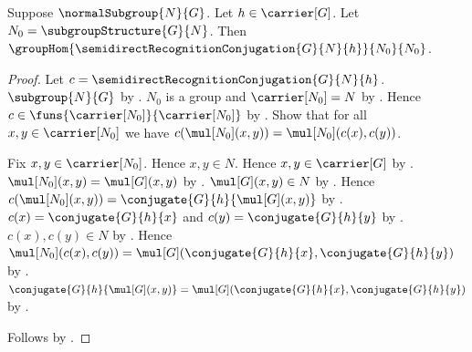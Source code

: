 \begin{theorem}\label{semidirect_recognition_conjugation_hom}
    Suppose $\normalSubgroup{N}{G}$.
    Let $h\in\carrier[G]$.
    Let $N_0=\subgroupStructure{G}{N}$.
    Then
        $\groupHom{\semidirectRecognitionConjugation{G}{N}{h}}
            {N_0}{N_0}$.
\end{theorem}
\begin{proof}
    Let $c=\semidirectRecognitionConjugation{G}{N}{h}$.
    $\subgroup{N}{G}$ by .
    $N_0$ is a group and $\carrier[N_0]=N$ by
        .
    Hence $c\in\funs{\carrier[N_0]}{\carrier[N_0]}$ by
        .
    Show that for all $x,y\in\carrier[N_0]$ we have
        $c(\mul[N_0](x,y))=\mul[N_0](c(x),c(y))$.
    \begin{subproof}
        Fix $x,y\in\carrier[N_0]$.
        Hence $x,y\in N$.
        Hence $x,y\in\carrier[G]$ by
            .
        $\mul[N_0](x,y)=\mul[G](x,y)$ by
            .
        $\mul[G](x,y)\in N$ by .
        Hence $c(\mul[N_0](x,y))=
            \conjugate{G}{h}{\mul[G](x,y)}$ by
            .
        $c(x)=\conjugate{G}{h}{x}$ and
            $c(y)=\conjugate{G}{h}{y}$ by
            .
        $c(x),c(y)\in N$ by
            .
        Hence $\mul[N_0](c(x),c(y))=
            \mul[G](\conjugate{G}{h}{x},\conjugate{G}{h}{y})$ by
            .
        $\conjugate{G}{h}{\mul[G](x,y)}=
            \mul[G](\conjugate{G}{h}{x},\conjugate{G}{h}{y})$ by
            .
    \end{subproof}
    Follows by .
\end{proof}

